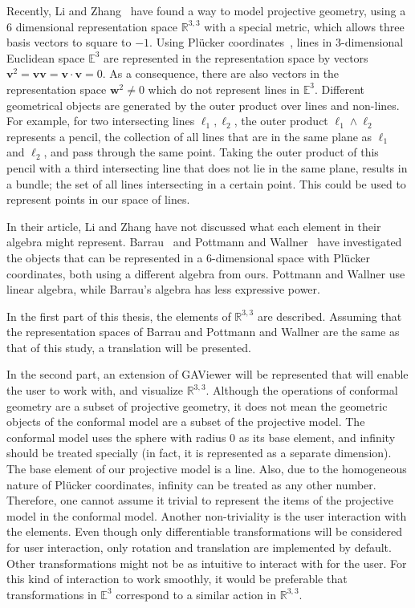 \documentclass[a4paper,11pt,twoside]{article}
\newcommand{\V}[1]{\ensuremath{\mathbf{#1}}}
\newcommand{\reals}{\ensuremath{\mathbb{R}}}
\newcommand{\RL}{\ensuremath{\reals^{3,3}}}
\begin{document}
Recently, Li and Zhang~\cite{Hongbo} have found a way to model projective geometry, using a 6 dimensional representation space $\RL$ with a special metric, which allows three basis vectors to square to $-1$.  Using Pl\"ucker coordinates~\cite{Hongbo,Pottmann2}, lines in 3-dimensional Euclidean space $\mathbb{E}^3$ are represented in the representation space by vectors $\V{v}^2 = \V{v} \V{v} = \V{v} \cdot \V{v} = 0$.  As a consequence, there are also vectors in the representation space $\V{w}^2 \not= 0$ which do not represent lines in $\mathbb{E}^3$.  Different geometrical objects are generated by the outer product over lines and non-lines.  For example, for two intersecting lines $\ell_1, \ell_2$, the outer product $\ell_1 \wedge \ell_2$ represents a pencil, the collection of all lines that are in the same plane as $\ell_1$ and $\ell_2$, and pass through the same point.  Taking the outer product of this pencil with a third intersecting line that does not lie in the same plane, results in a bundle; the set of all lines intersecting in a certain point.  This could be used to represent points in our space of lines.

In their article, Li and Zhang have not discussed what each element in their algebra might represent.  Barrau~\cite{Barrau1,Barrau2} and Pottmann and Wallner~\cite{Pottmann2,Pottmann3} have investigated the objects that can be represented in a 6-dimensional space with Pl\"ucker coordinates, both using a different algebra from ours.  Pottmann and Wallner use linear algebra, while Barrau's algebra has less expressive power.  

In the first part of this thesis, the elements of $\RL$ are described.  Assuming that the representation spaces of Barrau and Pottmann and Wallner are the same as that of this study, a translation will be presented.

In the second part, an extension of GAViewer will be represented that will enable the user to work with, and visualize $\RL$.  Although the operations of conformal geometry are a subset of projective geometry, it does not mean the geometric objects of the conformal model are a subset of the projective model.  The conformal model uses the sphere with radius $0$ as its base element, and infinity should be treated specially (in fact, it is represented as a separate dimension).  The base element of our projective model is a line.  Also, due to the homogeneous nature of Pl\"ucker coordinates, infinity can be treated as any other number.  Therefore, one cannot assume it trivial to represent the items of the projective model in the conformal model.  Another non-triviality is the user interaction with the elements.  Even though only differentiable transformations will be considered for user interaction, only rotation and translation are implemented by default.  Other transformations might not be as intuitive to interact with for the user.  For this kind of interaction to work smoothly, it would be preferable that transformations in $\mathbb{E}^3$ correspond to a similar action in $\RL$.
\end{document}
